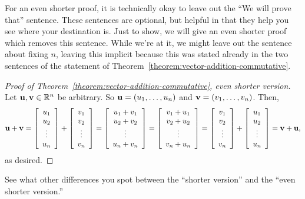 \documentclass{book}
\theoremstyle{ekimcustom}
\begin{document}
For an even shorter proof, it is technically okay to leave out the ``We will prove that'' sentence. These sentences are optional, but helpful in that they help you see where your destination is. Just to show, we will give an even shorter proof which removes this sentence. While we're at it, we might leave out the sentence about fixing $n$, leaving this implicit because this was stated already in the two sentences of the statement of Theorem~\ref{theorem:vector-addition-commutative}.
\begin{proof}[Proof of Theorem~\ref{theorem:vector-addition-commutative}, even shorter version]
Let ${\bf u}, {\bf v} \in \mathbb{R}^n$ be arbitrary. So ${\bf u} = (u_1,\dots,u_n)$ and ${\bf v} = (v_1,\dots,v_n)$. Then,
\[ {\bf u} + {\bf v}
= 
\left[ \begin{array}{c}u_1\\u_2\\\vdots\\u_n\end{array} \right]
+
\left[ \begin{array}{c}v_1\\v_2\\\vdots\\v_n\end{array} \right]
=
\left[ \begin{array}{c}u_1+v_1\\u_2+v_2\\\vdots\\u_n+v_n\end{array} \right]
=
\left[ \begin{array}{c}v_1+u_1\\v_2+u_2\\\vdots\\v_n+u_n\end{array} \right]
=
\left[ \begin{array}{c}v_1\\v_2\\\vdots\\v_n\end{array} \right]
+
\left[ \begin{array}{c}u_1\\u_2\\\vdots\\u_n\end{array} \right]
=
{\bf v} + {\bf u},\]
as desired.
\end{proof}
See what other differences you spot between the ``shorter version'' and the ``even shorter version.''
\end{document}
